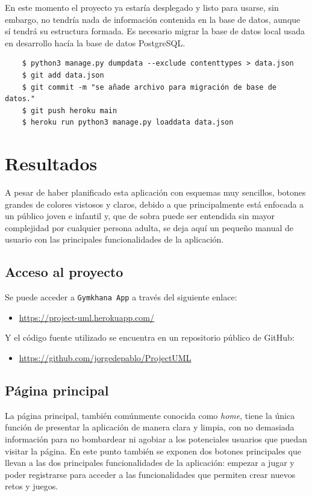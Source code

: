 \documentclass[a4paper, 12pt]{book}
\begin{document}
En este momento el proyecto ya estaría desplegado y listo para usarse, sin embargo, no tendría nada de información contenida en la base de datos, aunque sí tendrá su estructura formada. Es necesario migrar la base de datos local usada en desarrollo hacía la base de datos PostgreSQL.
\begin{verbatim}
	$ python3 manage.py dumpdata --exclude contenttypes > data.json
	$ git add data.json
	$ git commit -m "se añade archivo para migración de base de datos."
	$ git push heroku main
	$ heroku run python3 manage.py loaddata data.json
\end{verbatim}





\cleardoublepage
\chapter{Resultados}


\label{chap:resultados}

A pesar de haber planificado esta aplicación con esquemas muy sencillos, botones grandes de colores vistosos y claros, debido a que principalmente está enfocada a un público joven e infantil y, que de sobra puede ser entendida sin mayor complejidad por cualquier persona adulta, se deja aquí un pequeño manual de usuario con las principales funcionalidades de la aplicación.

\section{Acceso al proyecto}

Se puede acceder a \texttt{Gymkhana App} a través del siguiente enlace: 
\begin{itemize}
	\item \url{https://project-uml.herokuapp.com/}
\end{itemize}
Y el código fuente utilizado se encuentra en un repositorio público de GitHub: 
\begin{itemize}
	\item \url{https://github.com/jorgedepablo/ProjectUML}
\end{itemize}

\section{Página principal}
La página principal, también comúnmente conocida como \emph{home}, tiene la única función de presentar la aplicación de manera clara y limpia, con no demasiada información para no bombardear ni agobiar a los potenciales usuarios que puedan visitar la página. En este punto también se exponen dos botones principales que llevan a las dos principales funcionalidades de la aplicación: empezar a jugar y poder registrarse para acceder a las funcionalidades que permiten crear nuevos retos y juegos. 
\end{document}
